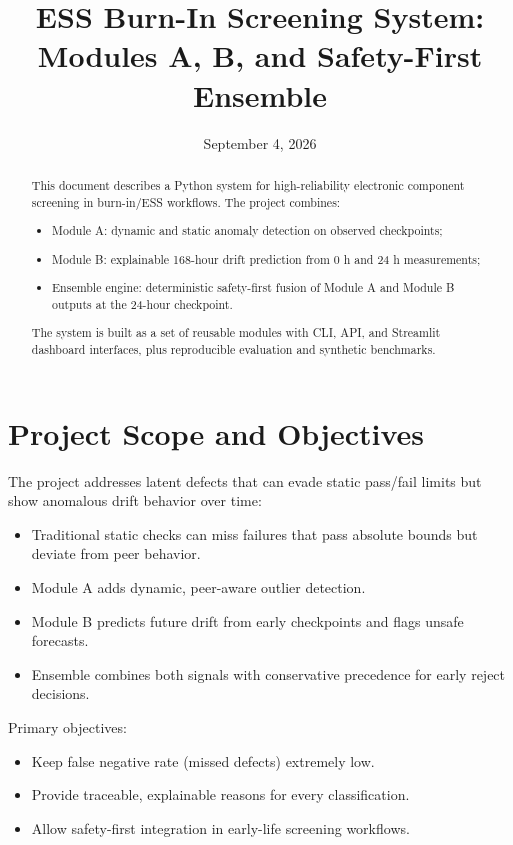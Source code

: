 \documentclass[11pt]{article}
\title{ESS Burn-In Screening System: Modules A, B, and Safety-First Ensemble}
\author{}
\date{September 4, 2026}
\begin{document}
\maketitle

\begin{abstract}
This document describes a Python system for high-reliability electronic component screening in burn-in/ESS workflows.  
The project combines:
\begin{itemize}[nosep]
  \item Module A: dynamic and static anomaly detection on observed checkpoints;
  \item Module B: explainable 168-hour drift prediction from 0 h and 24 h measurements;
  \item Ensemble engine: deterministic safety-first fusion of Module A and Module B outputs at the 24-hour checkpoint.
\end{itemize}
The system is built as a set of reusable modules with CLI, API, and Streamlit dashboard interfaces, plus reproducible evaluation and synthetic benchmarks.
\end{abstract}

\tableofcontents
\newpage

\section{Project Scope and Objectives}

The project addresses latent defects that can evade static pass/fail limits but show anomalous drift behavior over time:
\begin{itemize}[nosep]
  \item Traditional static checks can miss failures that pass absolute bounds but deviate from peer behavior.
  \item Module A adds dynamic, peer-aware outlier detection.
  \item Module B predicts future drift from early checkpoints and flags unsafe forecasts.
  \item Ensemble combines both signals with conservative precedence for early reject decisions.
\end{itemize}

Primary objectives:
\begin{itemize}[nosep]
  \item Keep false negative rate (missed defects) extremely low.
  \item Provide traceable, explainable reasons for every classification.
  \item Allow safety-first integration in early-life screening workflows.
\end{itemize}
\end{document}
